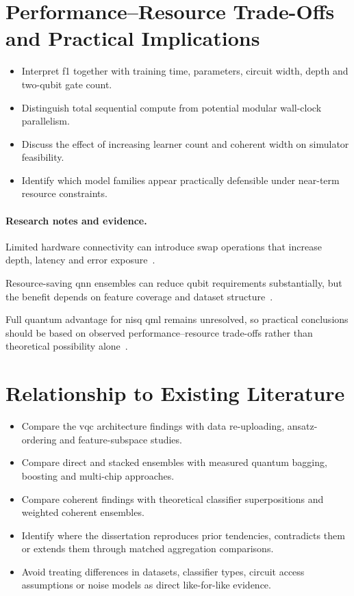 \documentclass[]{UCD_CS_MSc_AAI_Report}
\newcommand{\challenge}[1]{{\color{red}#1}}
\newcommand{\limitation}[1]{{\color{orange}#1}}
\newcommand{\benchmark}[1]{{\color{violet}#1}}
\newcommand{\researchnotes}{\paragraph{Research notes and evidence.}}
\begin{document}
\section{Performance--Resource Trade-Offs and Practical Implications}
\label{sec:discussion-resources}
\begin{itemize}
    \item Interpret \acl{f1} together with training time, parameters, circuit width, depth and two-qubit gate count.
    \item Distinguish total sequential compute from potential modular wall-clock parallelism.
    \item Discuss the effect of increasing learner count and coherent width on simulator feasibility.
    \item Identify which model families appear practically defensible under near-term resource constraints.
\end{itemize}

\researchnotes
\begin{itemize}
    \challenge{\item Limited hardware connectivity can introduce \ac{swap} operations that increase depth, latency and error exposure~\cite{resch_quantum_2019}.}
    \benchmark{\item Resource-saving \ac{qnn} ensembles can reduce qubit requirements substantially, but the benefit depends on feature coverage and dataset structure~\cite{incudini_resource_2023}.}
    \limitation{\item Full quantum advantage for \ac{nisq} \ac{qml} remains unresolved, so practical conclusions should be based on observed performance--resource trade-offs rather than theoretical possibility alone~\cite{du_quantum_2025}.}
\end{itemize}

\section{Relationship to Existing Literature}
\label{sec:discussion-literature}
\begin{itemize}
    \item Compare the \ac{vqc} architecture findings with data re-uploading, ansatz-ordering and feature-subspace studies.
    \item Compare direct and stacked ensembles with measured quantum bagging, boosting and multi-chip approaches.
    \item Compare coherent findings with theoretical classifier superpositions and weighted coherent ensembles.
    \item Identify where the dissertation reproduces prior tendencies, contradicts them or extends them through matched aggregation comparisons.
    \item Avoid treating differences in datasets, classifier types, circuit access assumptions or noise models as direct like-for-like evidence.
\end{itemize}
\end{document}
